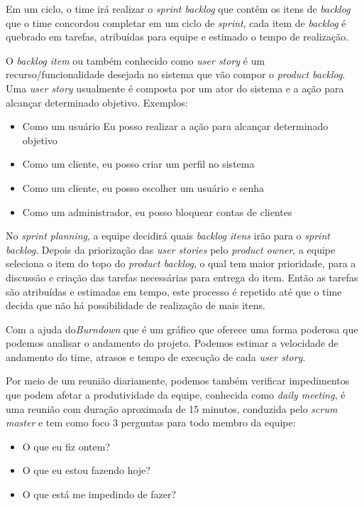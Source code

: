 \documentclass{abnt}
\begin{document}
			Em um ciclo, o time irá realizar o \emph{sprint backlog} que contêm os itens de \emph{backlog} que o time concordou 
			completar em um ciclo de \emph{sprint}, cada item de \emph{backlog} é quebrado em tarefas, atribuídas para equipe e estimado o tempo de realização.
			
					
			O \emph{backlog item} ou também conhecido como \emph{user story} é um recurso/funcionalidade desejada no sistema que vão compor o
			\emph{product backlog}. Uma \emph{user story} usualmente é composta por um ator do sistema e a ação para alcançar determinado
			objetivo. Exemplos: 
				\begin{itemize}
					\item Como um usuário Eu posso realizar a ação para alcançar determinado objetivo
					\item Como um cliente, eu posso criar um perfil no sistema
					\item Como um cliente, eu posso escolher um usuário e senha
					\item Como um administrador, eu posso bloquear contas de clientes
				\end{itemize}
					 
					
			No \emph{sprint planning}, a equipe decidirá quais \emph{backlog itens} irão para o \emph{sprint backlog}. Depois da priorização das \emph{user
			stories} pelo \emph{product owner}, a equipe seleciona o item do topo do \emph{product backlog}, o qual tem maior prioridade, para a
			discussão e criação das tarefas necessárias para entrega do item. Então as tarefas são atribuídas e estimadas em
			tempo, este processo é repetido até que o time decida que não há possibilidade de realização de mais itens.
			
			Com a ajuda do\emph{Burndown} que é um gráfico que oferece uma forma poderosa que podemos analisar o andamento do projeto. Podemos estimar a velocidade de andamento do time, atrasos e tempo de 
			execução de cada \emph{user story}.
			
			Por meio de um reunião diariamente, podemos também verificar impedimentos que podem afetar a produtividade da equipe, conhecida como \emph{daily meeting}, 
			é uma reunião com duração aproximada de 15 minutos,	conduzida pelo \emph{scrum master} e tem como foco 3 perguntas para todo membro da equipe:
				\begin{itemize}
					\item O que eu fiz ontem?
					\item O que eu estou fazendo hoje?
					\item O que está me impedindo de fazer?
				\end{itemize}
			
\end{document}
